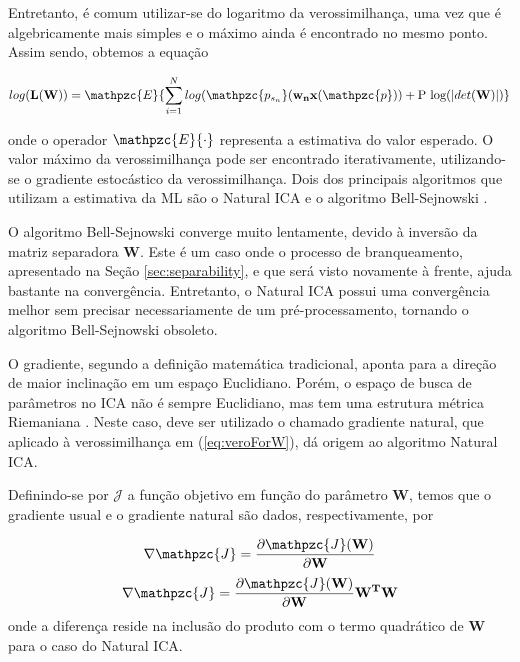     Entretanto, é comum utilizar-se do logaritmo da verossimilhança, uma vez que é algebricamente mais simples e o máximo ainda é encontrado no mesmo ponto. Assim sendo, obtemos a equação
    
        \begin{equation}
        \label{eq:logverossimilance}
        log(\mathbf{L(W)}) = \mathpzc{E}\{\sum_{i=1}^Nlog(\mathpzc{p_{s_n}}(\mathbf{w_nx}(\mathpzc{p})) + \text{P log}(|det(\mathbf{W})|)\}
    \end{equation}
    
    onde o operador $\mathpzc{E}\{\cdot\}$ representa a estimativa do valor esperado. O valor máximo da verossimilhança pode ser encontrado iterativamente, utilizando-se o gradiente estocástico da verossimilhança. Dois dos principais algoritmos que utilizam a estimativa da ML são o Natural ICA \cite{NaturalICA} e o algoritmo Bell-Sejnowski \cite{ICAML}.
    
    O algoritmo Bell-Sejnowski converge muito lentamente, devido à inversão da matriz separadora $\mathbf{W}$. Este é um caso onde o processo de branqueamento, apresentado na Seção \ref{sec:separability}, e que será visto novamente à frente, ajuda bastante na convergência. Entretanto, o Natural ICA possui uma convergência melhor sem precisar necessariamente de um pré-processamento, tornando o algoritmo Bell-Sejnowski obsoleto.
    
    O gradiente, segundo a definição matemática tradicional, aponta para a direção de maior inclinação em um espaço Euclidiano. Porém, o espaço de busca de parâmetros no ICA não é sempre Euclidiano, mas tem uma estrutura métrica Riemaniana \cite{Riemenn}. Neste caso, deve ser utilizado o chamado gradiente natural, que aplicado à verossimilhança em (\ref{eq:veroForW}), dá origem ao algoritmo Natural ICA.
    
    Definindo-se por $\mathcal{J}$ a função objetivo em função do parâmetro $\mathbf{W}$, temos que o gradiente usual e o gradiente natural são dados, respectivamente, por
    
    \begin{equation}
        \label{eq:gradiente}
        \nabla\mathpzc{J} = \frac{\partial \mathpzc{J}(\mathbf{W})}{\partial \mathbf{W}}
    \end{equation}
    \begin{equation}
        \label{eq:naturalgradiente}
        \nabla\mathpzc{J} = \frac{\partial \mathpzc{J}(\mathbf{W})}{\partial \mathbf{W}}\mathbf{W^T}\mathbf{W}
    \end{equation}
    onde a diferença reside na inclusão do produto com o termo quadrático de $\mathbf{W}$ para o caso do Natural ICA.
    

